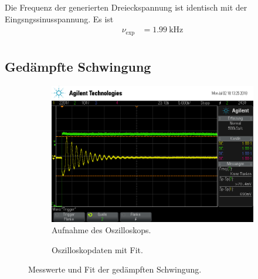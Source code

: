 Die Frequenz der generierten Dreieckspannung ist identisch mit der Eingsngssinusspannung.
Es ist
\begin{align*}
  \nu_\text{exp} &= \SI{1.99}{\kilo\hertz} \\
\end{align*}

\subsection{Ged\"ampfte Schwingung}

\begin{figure}[ht]
  \centering
  \begin{subfigure}{\textwidth}
    \centering
    \includegraphics[height=0.3\textheight]{data/scope_275.png}
    \caption{Aufnahme des Oszilloskops.}%
    \label{fig:gedaempft_oszilloskop}
  \end{subfigure}
  \begin{subfigure}{\textwidth}
    \centering
    
    \caption{Oszilloskopdaten mit Fit.}%
    \label{fig:gedaempft_fit}
  \end{subfigure}
  \caption{Messwerte und Fit der gedämpften Schwingung.}%
  \label{fig:gedaempft}
\end{figure}


